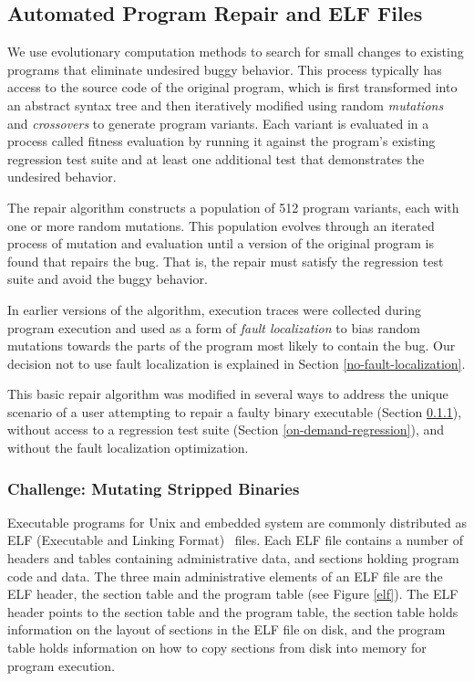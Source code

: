 \documentclass{sigcomm-alternate}
\begin{document}
\subsection{Automated Program Repair and ELF Files}
\label{sec-3-2}

We use evolutionary computation methods
\cite{forrest2009genetic,genprog-tse-journal,le2012representations,legoues2011systematicstudy}
to search for small changes to existing programs that eliminate
undesired buggy behavior.  This process typically has access to the
source code of the original program, which is first transformed into
an abstract syntax tree and then iteratively modified using random
\emph{mutations} and \emph{crossovers} to generate program variants.
Each variant is evaluated in a process called fitness evaluation by
running it against the program's existing regression test suite and at
least one additional test that demonstrates the undesired behavior.

The repair algorithm constructs a population of 512 program variants,
each with one or more random mutations.  This population evolves
through an iterated process of mutation and evaluation until a version
of the original program is found that repairs the bug.  That is, the
repair must satisfy the regression test suite and avoid the buggy
behavior.

In earlier versions of the algorithm, execution traces were collected
during program execution and used as a form of \emph{fault
  localization} to bias random mutations towards the parts of the
program most likely to contain the bug.  Our decision not to use fault
localization is explained in Section \ref{no-fault-localization}.

This basic repair algorithm was modified in several ways to address
the unique scenario of a user attempting to repair a faulty binary
executable (Section \ref{mutate-mips}), without access to a regression
test suite (Section \ref{on-demand-regression}), and without the fault
localization optimization.

\subsubsection{Challenge: Mutating Stripped Binaries}
\label{mutate-mips}

Executable programs for Unix and embedded system are commonly distributed
as ELF (Executable and Linking Format)~\cite{tis1995tool} files. 
Each ELF file contains a number of headers
and tables containing administrative data, and sections holding
program code and data.  The three main administrative elements of an
ELF file are the ELF header, the section table and the program table
(see Figure \ref{elf}).  The ELF header points to the section table and the
program table, the section table holds information on the layout of
sections in the ELF file on disk, and the program table holds
information on how to copy sections from disk into memory for program
execution.
\end{document}
